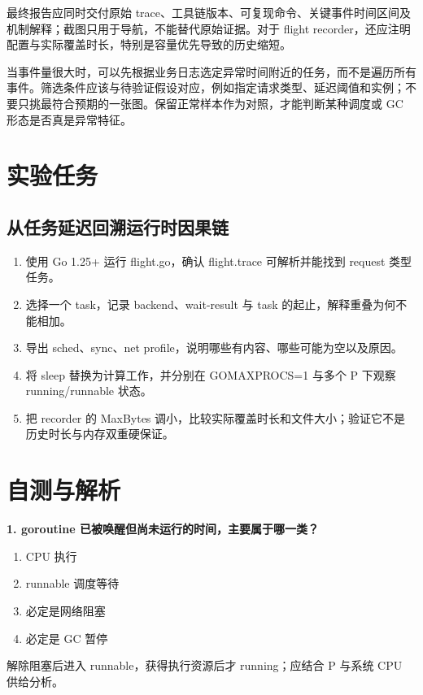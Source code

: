 \documentclass[UTF8,fontset=fandol,openany,11pt]{ctexbook}
\begin{document}
最终报告应同时交付原始 trace、工具链版本、可复现命令、关键事件时间区间及机制解释；截图只用于导航，不能替代原始证据。对于 flight recorder，还应注明配置与实际覆盖时长，特别是容量优先导致的历史缩短。

当事件量很大时，可以先根据业务日志选定异常时间附近的任务，而不是遍历所有事件。筛选条件应该与待验证假设对应，例如指定请求类型、延迟阈值和实例；不要只挑最符合预期的一张图。保留正常样本作为对照，才能判断某种调度或 GC 形态是否真是异常特征。

\section{实验任务}
\subsection*{从任务延迟回溯运行时因果链}
\begin{enumerate}
\item 使用 Go 1.25+ 运行 flight.go，确认 flight.trace 可解析并能找到 request 类型任务。

\item 选择一个 task，记录 backend、wait-result 与 task 的起止，解释重叠为何不能相加。

\item 导出 sched、sync、net profile，说明哪些有内容、哪些可能为空以及原因。

\item 将 sleep 替换为计算工作，并分别在 GOMAXPROCS=1 与多个 P 下观察 running/runnable 状态。

\item 把 recorder 的 MaxBytes 调小，比较实际覆盖时长和文件大小；验证它不是历史时长与内存双重硬保证。

\end{enumerate}
\section{自测与解析}
\noindent\textbf{1. goroutine 已被唤醒但尚未运行的时间，主要属于哪一类？}
\begin{enumerate}[label=\Alph*.]
\item CPU 执行
\item runnable 调度等待
\item 必定是网络阻塞
\item 必定是 GC 暂停
\end{enumerate}
解除阻塞后进入 runnable，获得执行资源后才 running；应结合 P 与系统 CPU 供给分析。
\end{document}
